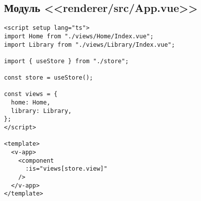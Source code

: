 \subsection{Модуль <<renderer/src/App.vue>>}
\begin{lstlisting}[language=vue]
<script setup lang="ts">
import Home from "./views/Home/Index.vue";
import Library from "./views/Library/Index.vue";

import { useStore } from "./store";

const store = useStore();

const views = {
  home: Home,
  library: Library,
};
</script>

<template>
  <v-app>
    <component
      :is="views[store.view]"
    />
  </v-app>
</template>
\end{lstlisting}